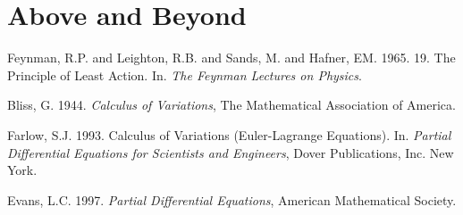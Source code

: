 \documentclass{article}
\begin{document}
\section{Above and Beyond}




\cite{EVANS}




\footnotesize
 \begin{thebibliography}{99}

 Feynman, R.P. and Leighton, R.B. and Sands, M. and Hafner, EM. 1965. 19. The Principle of Least Action. In. {\em
The Feynman Lectures on Physics}.

 Bliss, G. 1944. {\em
Calculus of Variations}, The Mathematical Association of America.

 Farlow, S.J. 1993. Calculus of Variations (Euler-Lagrange Equations). In. {\em Partial Differential Equations for Scientists and Engineers}, Dover Publications, Inc. New York. 

 Evans, L.C. 1997. {\em Partial Differential Equations}, American Mathematical Society. 


\end{thebibliography}



%
\end{document}
